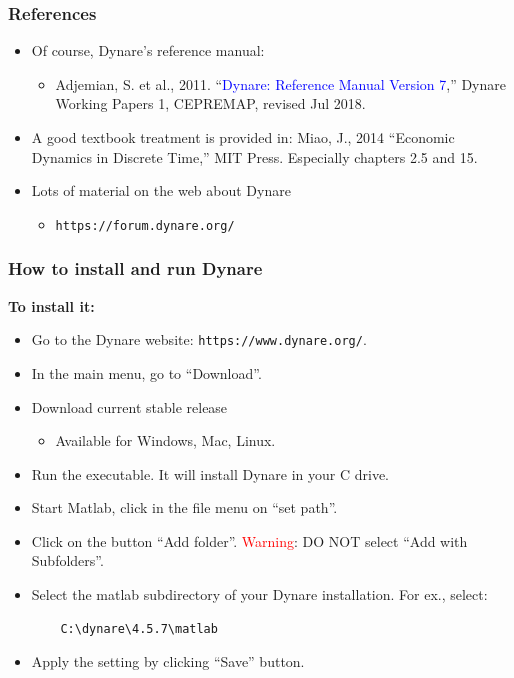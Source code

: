 \documentclass{beamer}
\begin{document}
\begin{frame}%
\frametitle{References}

\begin{itemize}

\item Of course, Dynare's reference manual:

\begin{itemize}
	\item Adjemian, S. et al., 2011. ``\textcolor{blue}{Dynare: Reference Manual Version 7},'' Dynare Working Papers 1, CEPREMAP, revised Jul 2018.
\end{itemize}

\item A good textbook treatment is provided in: Miao, J., 2014 ``Economic Dynamics in Discrete Time,'' MIT Press. Especially chapters 2.5 and 15.

\item Lots of material on the web about Dynare

\begin{itemize}
	\item \texttt{https://forum.dynare.org/}
\end{itemize}

\end{itemize}

\end{frame}

\begin{frame}[fragile]
\frametitle{How to install and run Dynare}

\textbf{To install it:}
\begin{itemize}
	\item Go to the Dynare website: \texttt{https://www.dynare.org/}.
	\item In the main menu, go to ``Download''.
	\item Download current stable release
	\begin{itemize}
		\item Available for Windows, Mac, Linux.
	\end{itemize}
    \item Run the executable. It will install Dynare in your C drive.
    \item Start Matlab, click in the file menu on ``set path''.
    \item Click on the button ``Add folder''. \textcolor{red}{Warning}: DO NOT select ``Add with Subfolders''.
    \item Select the matlab subdirectory of your Dynare installation. For ex., select: 
    \begin{verbatim}
    C:\dynare\4.5.7\matlab
    \end{verbatim}
    \item Apply the setting by clicking ``Save'' button.
\end{itemize}
\end{frame}
\end{document}
